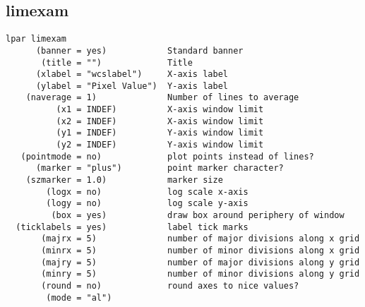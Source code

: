 \subsection{limexam}
\begingroup \fontsize{10pt}{10pt}
\selectfont
\begin{verbatim} 
lpar limexam
      (banner = yes)            Standard banner
       (title = "")             Title
      (xlabel = "wcslabel")     X-axis label
      (ylabel = "Pixel Value")  Y-axis label
    (naverage = 1)              Number of lines to average
          (x1 = INDEF)          X-axis window limit
          (x2 = INDEF)          X-axis window limit
          (y1 = INDEF)          Y-axis window limit
          (y2 = INDEF)          Y-axis window limit
   (pointmode = no)             plot points instead of lines?
      (marker = "plus")         point marker character?
    (szmarker = 1.0)            marker size
        (logx = no)             log scale x-axis
        (logy = no)             log scale y-axis
         (box = yes)            draw box around periphery of window
  (ticklabels = yes)            label tick marks
       (majrx = 5)              number of major divisions along x grid
       (minrx = 5)              number of minor divisions along x grid
       (majry = 5)              number of major divisions along y grid
       (minry = 5)              number of minor divisions along y grid
       (round = no)             round axes to nice values?
        (mode = "al")           
\end{verbatim}
\endgroup

